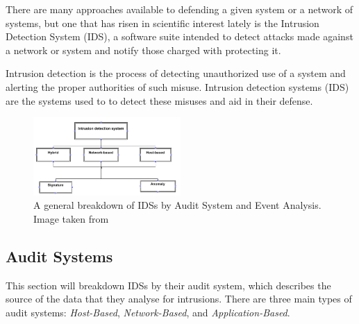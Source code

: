 \documentclass{acm_proc_article-sp}
\begin{document}
	There are many approaches available to defending a given system or a network of systems, but one that has risen in scientific interest lately is the Intrusion Detection System (IDS), a software suite intended to detect attacks made against a network or system and notify those charged with protecting it.
	
	Intrusion detection is the process of detecting unauthorized use of a system and alerting the proper authorities of such misuse. Intrusion detection systems (IDS) are the systems used to to detect these misuses and aid in their defense. 
	\begin{figure}[h!]
		\centering
		\includegraphics[width=0.5\textwidth]{idsBreakdown.png}
		\caption{A general breakdown of IDSs by Audit System and Event Analysis. Image taken from \cite{Alenezi2012}}
		\label{breakdown}
	\end{figure}

    \subsection{Audit Systems}
    	This section will breakdown IDSs by their audit system, which describes the source of the data that they analyse for intrusions. There are three main types of audit systems: \emph{Host-Based}, \emph{Network-Based}, and \emph{Application-Based}.
\end{document}
